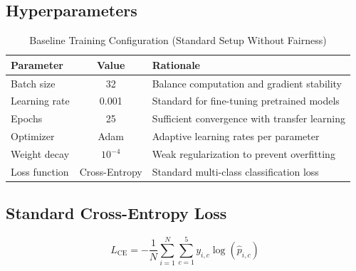 \documentclass[11pt,a4paper,oneside]{report}
\begin{document}
\subsection{Hyperparameters}

\begin{table}[h]

\centering

\caption{Baseline Training Configuration (Standard Setup Without Fairness)}

\begin{tabular}{|l|c|l|}

\hline

\textbf{Parameter} & \textbf{Value} & \textbf{Rationale} \\

\hline

Batch size & 32 & Balance computation and gradient stability \\

\hline

Learning rate & 0.001 & Standard for fine-tuning pretrained models \\

\hline

Epochs & 25 & Sufficient convergence with transfer learning \\

\hline

Optimizer & Adam & Adaptive learning rates per parameter \\

\hline

Weight decay & $10^{-4}$ & Weak regularization to prevent overfitting \\

\hline

Loss function & Cross-Entropy & Standard multi-class classification loss \\

\hline

\end{tabular}

\end{table}

\subsection{Standard Cross-Entropy Loss}

\begin{equation}
L_{\text{CE}} = -\frac{1}{N} \sum_{i=1}^{N} \sum_{c=1}^{5} y_{i,c} \log(\hat{p}_{i,c})
\end{equation}
\end{document}
